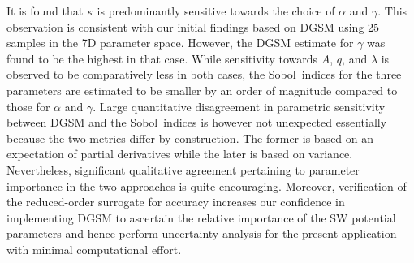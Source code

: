 It is found that $\kappa$ is predominantly sensitive towards the choice of $\alpha$ and
$\gamma$. This observation is consistent with our initial findings based on DGSM using 25 samples in the 7D
parameter space. However, the DGSM estimate for $\gamma$ was found to be the highest in that case. 
While sensitivity towards $A$, $q$, and $\lambda$ is observed to be comparatively less in both cases, the 
Sobol\textquotesingle~indices for the three parameters are estimated to be smaller by an order of magnitude
 compared to those
for $\alpha$ and $\gamma$. Large quantitative disagreement in parametric sensitivity between DGSM and the 
Sobol\textquotesingle~indices is however not unexpected essentially because the two metrics differ by construction.
The former is based
on an expectation of partial derivatives while the later is based on variance. Nevertheless, significant qualitative
agreement pertaining to parameter importance in the two approaches is quite encouraging. 
Moreover, verification of the reduced-order
surrogate for accuracy increases our confidence in implementing DGSM to ascertain the relative importance of the
SW potential parameters and hence perform uncertainty analysis for the present application with minimal
computational effort. 


























